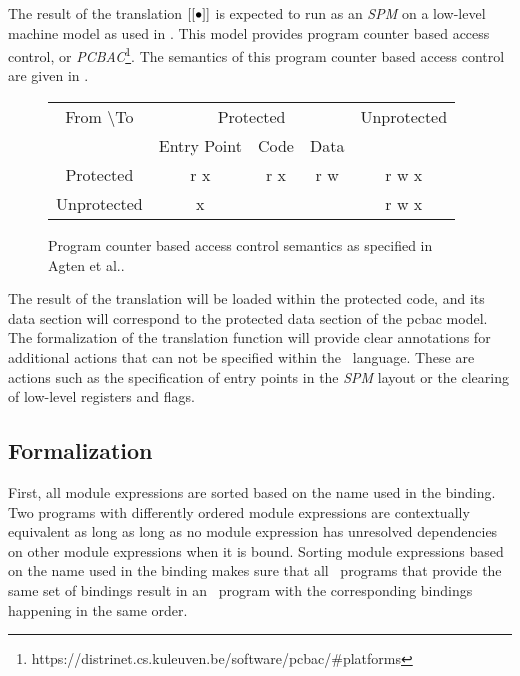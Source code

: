 The result of the translation $[[\bullet]]$ is expected to run as an \emph{SPM} on a low-level machine model as used in \cite{Agten:2012:SCM:2354412.2355247,Patrignani}.
This model provides program counter based access control, or \emph{PCBAC}\footnote{https://distrinet.cs.kuleuven.be/software/pcbac/\#platforms}.
The semantics of this program counter based access control are given in .

\begin{figure}[htb]
    \centering
	\begin{tabular}{|c|c|c|c|c|}
		\hline
		From \textbackslash To & \multicolumn{3}{c|}{Protected} & Unprotected \\
		& Entry Point & Code & Data & \\ \hline
		Protected & r x & r x & r w & r w x \\ \hline
		Unprotected & x & & & r w x \\ \hline
	\end{tabular}
    \caption[PCBAC Semantics]{Program counter based access control semantics as specified in Agten et al.\cite{Agten:2012:SCM:2354412.2355247}. \label{fig:PCBAC}}
\end{figure}

The result of the translation will be loaded within the protected code, and its data section will correspond to the protected data section of the pcbac model.
The formalization of the translation function \cmath{\compile{\bullet}} will provide clear annotations for additional actions that can not be specified within the \LLVMIR\ language.
These are actions such as the specification of entry points in the \emph{SPM} layout or the clearing of low-level registers and flags.

\subsection{Formalization}
First, all module expressions are sorted based on the name used in the binding.
Two programs with differently ordered module expressions  are contextually equivalent as long as long as no module expression  has unresolved dependencies on other module expressions when it is bound.
Sorting module expressions based on the name used in the binding makes sure that all \MiniML\ programs that provide the same set of bindings result in an \LLVMIR\ program with the corresponding bindings happening in the same order.



